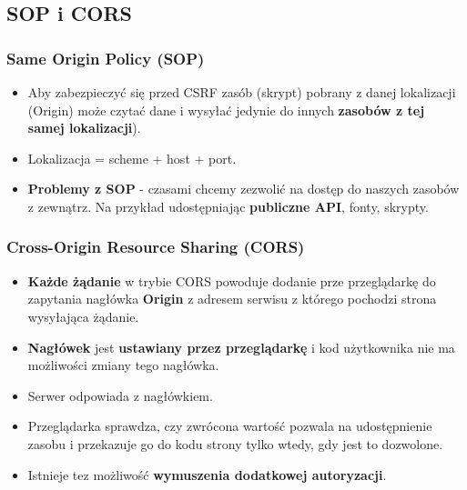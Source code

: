 \documentclass[../main.tex]{subfiles}
\begin{document}
    \subsection{SOP i CORS}
    \subsubsection{Same Origin Policy (SOP)}
    \begin{itemize}
        \item Aby zabezpieczyć się przed CSRF zasób (skrypt) pobrany z danej lokalizacji
        (Origin) może czytać dane i wysyłać jedynie do innych  \textbf{zasobów z tej samej
        lokalizacji}).
        \item Lokalizacja = scheme + host + port.
        \item \textbf{Problemy z SOP} - czasami chcemy zezwolić na dostęp do naszych zasobów z zewnątrz. Na
        przykład udostępniając  \textbf{publiczne API}, fonty, skrypty.
    \end{itemize}

    \subsubsection{Cross-Origin Resource Sharing (CORS)}
    \begin{itemize}
        \item \textbf{Każde żądanie} w trybie CORS powoduje dodanie prze przeglądarkę do
        zapytania nagłówka \textbf{Origin} z adresem serwisu z którego pochodzi strona
        wysyłająca żądanie.
        \item \textbf{Nagłówek} jest \textbf{ustawiany przez przeglądarkę} i kod użytkownika nie ma
        możliwości zmiany tego nagłówka.
        \item Serwer odpowiada z nagłówkiem.
        \item Przeglądarka sprawdza, czy zwrócona wartość pozwala na udostępnienie
        zasobu i przekazuje go do kodu strony tylko wtedy, gdy jest to dozwolone.
        \item Istnieje tez możliwość \textbf{wymuszenia dodatkowej autoryzacji}.
    \end{itemize}
\end{document}
